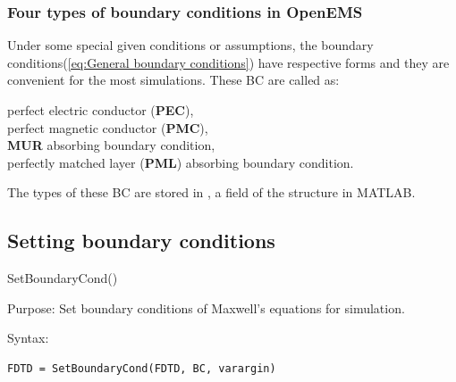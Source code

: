     \subsubsection{Four  types of boundary conditions in OpenEMS}\label{subsubsec:Four particularly usefull BC}
	Under some special given conditions or assumptions, the boundary conditions(\ref{eq:General boundary conditions}) have  respective forms and they are convenient for the most simulations. These BC are called as:
       \begin{myindentpar}[2cm]
	       perfect electric conductor (\textbf{PEC}), \\
	     perfect magnetic conductor (\textbf{PMC}),\\
	      \textbf{MUR} absorbing boundary condition,\\
              perfectly matched layer (\textbf{PML}) absorbing boundary condition.
       \end{myindentpar}
The types of these BC are stored in , a field of the structure   in MATLAB.  \label{para:BoundaryCond}
    \subsection{Setting boundary conditions}\label{subsec:Setting boundary conditions in OpenEMS with function SetBoundaryCond}
\begin{FontNameFunct}{SetBoundaryCond()}
 \label{func:SetBoundaryCond}
\end{FontNameFunct}

\begin{FontDescr}{Purpose:}
Set  boundary conditions of Maxwell's equations for simulation.%
\end{FontDescr}

\begin{FontDescr}{Syntax:}
      \begin{lstlisting}
FDTD = SetBoundaryCond(FDTD, BC, varargin)
      \end{lstlisting}
\end{FontDescr}

